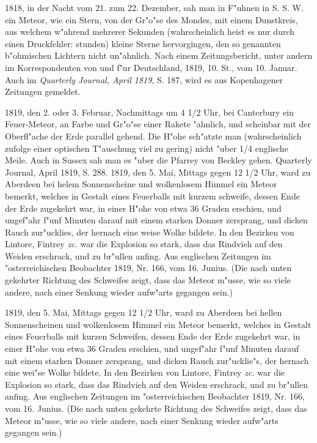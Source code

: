 \documentclass[a4paper, 11pt, oneside, polutonikogreek, german]{article}
\begin{document}
1818, in der Nacht vom 21. zum 22. Dezember, sah man in F"uhnen in S. S. W. ein Meteor, wie ein Stern, von der Gr"o"se des Mondes, mit einem Dunstkreis, aus welchem w"ahrend mehrerer Sekunden (wahrscheinlich heist es nur durch einen Druckfehler: stunden) kleine Sterne hervorgingen, den so genannten b"ohmischen Lichtern nicht un"ahnlich. Nach einem Zeitungsbericht, unter andern im Korrespondenten von und f"ur Deutschland, 1819, 10. St., vom 10. Januar. Auch im \emph{Quarterly Journal, April 1819}, S. 187, wird es aus Kopenhagener Zeitungen gemeldet.

1819, den 2. oder 3. Februar, Nachmittags um 4 1/2 Uhr, bei Canterbury ein Feuer-Meteor, an Farbe und Gr"o"se einer Rakete "ahnlich, und scheinbar mit der Oberfl"ache der Erde parallel gehend. Die H"ohe sch"atzte man (wahrscheinlich zufolge einer optischen T"auschung viel zu gering) nicht "uber 1/4 englische Meile. Auch in Sussex sah man es "uber die Pfarrey von Beckley gehen. Quarterly Journal, April 1819, S. 288. 1819, den 5. Mai, Mittags gegen 12 1/2 Uhr, ward zu Aberdeen bei helem Sonnenscheine und wolkenlosem Himmel ein Meteor bemerkt, welches in Gestalt eines Feuerballs mit kurzem schweife, dessen Ende der Erde zugekehrt war, in einer H"ohe von etwa 36 Graden erschien, und ungef"ahr f"unf Minuten darauf mit einem starken Donner zersprang, und dicken Rauch zur"ucklies, der hernach eine weise Wolke bildete. In den Bezirken von Lintore, Fintrey \emph{zc.} war die Explosion so stark, dass das Rindvieh auf den Weiden erschrack, und zu br"ullen anfing. Aus englischen Zeitungen im "osterreichischen Beobachter 1819, Nr. 166, vom 16. Junius. (Die nach unten gekehrter Richtung des Schweifes zeigt, dass das Meteor m"usse, wie so viele andere, nach einer Senkung wieder aufw"arts gegangen sein.)

1819, den 5. Mai, Mittags gegen 12 1/2 Uhr, ward zu Aberdeen bei hellen Sonnenscheinen und wolkenlosem Himmel ein Meteor bemerkt, welches in Gestalt eines Feuerballs mit kurzen Schweifen, dessen Ende der Erde zugekehrt war, in einer H"ohe von etwa 36 Graden erschien, und ungef"ahr f"unf Minuten darauf mit einem starken Donner zersprang, und dicken Rauch zur"ucklie"s, der hernach eine wei"se Wolke bildete. In den Bezirken von Lintore, Fintrey \emph{zc.} war die Explosion so stark, dass das Rindvieh auf den Weiden erschrack, und zu br"ullen anfing. Aus englischen Zeitungen im "osterreichischen Beobachter 1819, Nr. 166, vom 16. Junius. (Die nach unten gekehrte Richtung des Schweifes zeigt, dass das Meteor m"usse, wie so viele andere, nach einer Senkung wieder aufw"arts gegangen sein.)
\clearpage
\end{document}

